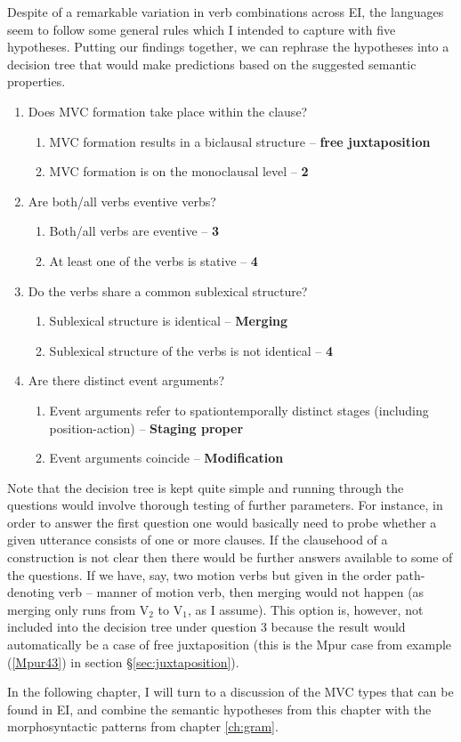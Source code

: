 Despite of a remarkable variation in verb combinations across EI, the languages seem to follow some general rules which I intended to capture with five hypotheses. Putting our findings together, we can rephrase the hypotheses into a decision tree that would make predictions based on the suggested semantic properties.


\begin{enumerate}
\item Does MVC formation take place within the clause?
\begin{enumerate}
\item MVC formation results in a biclausal structure -- \textbf{free juxtaposition}
\item MVC formation is on the monoclausal level -- \textbf{2}
\end{enumerate}
\item Are both/all verbs eventive verbs?
\begin{enumerate}
\item Both/all verbs are eventive -- \textbf{3}
\item At least one of the verbs is stative -- \textbf{4}
\end{enumerate}
\item Do the verbs share a common sublexical structure?
\begin{enumerate}
\item Sublexical structure is identical -- \textbf{Merging}
\item Sublexical structure of the verbs is not identical -- \textbf{4}
\end{enumerate}
\item Are there distinct event arguments?
\begin{enumerate}
\item Event arguments refer to spationtemporally distinct stages (including position-action) -- \textbf{Staging proper}
\item Event arguments coincide -- \textbf{Modification}
\end{enumerate}
\end{enumerate}


Note that the decision tree is kept quite simple and running through the questions would involve thorough testing of further parameters. For instance, in order to answer the first question one would basically need to probe whether a given utterance consists of one or more clauses. If the clausehood of a construction is not clear then there would be further answers available to some of the questions. If we have, say, two motion verbs but given in the order path-denoting verb -- manner of motion verb, then merging would not happen (as merging only runs from V$_2$ to V$_1$, as I assume). This option is, however, not included into the decision tree under question 3 because the result would automatically be a case of free juxtaposition (this is the Mpur case from example (\ref{Mpur43}) in section §\ref{sec:juxtaposition}).

In the following chapter, I will turn to a discussion of the MVC types that can be found in EI, and combine the semantic hypotheses from this chapter with the morphosyntactic patterns from chapter \ref{ch:gram}.